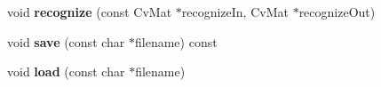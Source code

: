 \begin{DoxyCompactItemize}
\item 
\hypertarget{class_m_l_alg_ae05ba5c235d576a81f2a82eef06448ed}{void {\bfseries recognize} (const Cv\-Mat $\ast$recognize\-In, Cv\-Mat $\ast$recognize\-Out)}\label{class_m_l_alg_ae05ba5c235d576a81f2a82eef06448ed}

\item 
\hypertarget{class_m_l_alg_a368d08fe8e04e626e56bd17d531ef795}{void {\bfseries save} (const char $\ast$filename) const }\label{class_m_l_alg_a368d08fe8e04e626e56bd17d531ef795}

\item 
\hypertarget{class_m_l_alg_a3651488762f2ba0d7f28e9ee114674bf}{void {\bfseries load} (const char $\ast$filename)}\label{class_m_l_alg_a3651488762f2ba0d7f28e9ee114674bf}

\end{DoxyCompactItemize}
